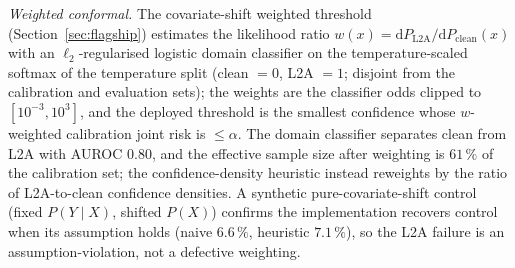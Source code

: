 \documentclass[preprint,3p,times]{elsarticle}
\begin{document}
\emph{Weighted conformal.} The covariate-shift weighted threshold (Section~\ref{sec:flagship}) estimates the likelihood ratio $w(x)=\mathrm{d}P_{\mathrm{L2A}}/\mathrm{d}P_{\mathrm{clean}}(x)$ with an $\ell_2$-regularised logistic domain classifier on the temperature-scaled softmax of the temperature split (clean $=0$, L2A $=1$; disjoint from the calibration and evaluation sets); the weights are the classifier odds clipped to $[10^{-3},10^{3}]$, and the deployed threshold is the smallest confidence whose $w$-weighted calibration joint risk is $\leq\alpha$. The domain classifier separates clean from L2A with AUROC $0.80$, and the effective sample size after weighting is $61\,\%$ of the calibration set; the confidence-density heuristic instead reweights by the ratio of L2A-to-clean confidence densities. A synthetic pure-covariate-shift control (fixed $P(Y\!\mid\!X)$, shifted $P(X)$) confirms the implementation recovers control when its assumption holds (naive $6.6\,\%$, heuristic $7.1\,\%$), so the L2A failure is an assumption-violation, not a defective weighting.



\end{document}
